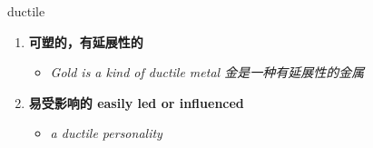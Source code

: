 
\begin{frame}
{\huge ductile}
\begin{center}
\begin{enumerate}\Large
  \item \textbf{可塑的，有延展性的}
  \begin{itemize}
    \item \em{\Large{Gold is a kind of ductile metal 金是一种有延展性的金属}}
  \end{itemize}
  \item \textbf{易受影响的 easily led or influenced}
  \begin{itemize}
    \item \em{\Large{a ductile personality}}
  \end{itemize}
\end{enumerate}
\end{center}
\end{frame}
